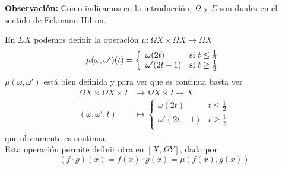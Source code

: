\textbf{Observación:} Como indicamos en la introducción, $\Omega$ y $\Sigma$ son duales en el sentido de Eckmann-Hilton. \par

En $\Sigma X$ podemos definir la operación  $\mu : \Omega X \times \Omega X \longrightarrow \Omega X$
\[
\mu(\omega, \omega')(t) = 
\left\{ \begin{array}{ll}
             \omega(2t)		&   $si $ t \leq \frac{1}{2} \\
             \omega'(2t-1)	&   $si $ t \geq \frac{1}{2} \\
        \end{array}
\right.
\]
$\mu(\omega, \omega')$ está bien definida y para ver que es continua basta ver
\begin{align*}
\Omega X \times \Omega X \times I &\longrightarrow \Omega X \times I \longrightarrow X \\
(\omega, \omega', t) &\longmapsto 
\left\{ \begin{array}{ll}
             \omega(2t)		&  t \leq \frac{1}{2} \\
             \omega'(2t-1)	&  t \geq \frac{1}{2} \\
        \end{array}
\right.
\end{align*}
que obviamente es continua. \\
Esta operación permite definir otra en $[X, \Omega Y]$, dada por 
\[ (f \cdotp g)(x) = f(x) \cdotp g(x) = \mu(f(x), g(x)) \]

